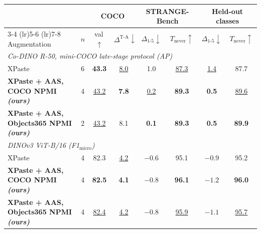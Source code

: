 \begin{tabular}{l c cc cc cc}
\toprule
& & \multicolumn{2}{c}{COCO} & \multicolumn{2}{c}{STRANGE-Bench} & \multicolumn{2}{c}{Held-out classes} \\
\cmidrule(lr){3-4} \cmidrule(lr){5-6} \cmidrule(lr){7-8}
Augmentation & $n$ & val\,$\uparrow$ & $\Delta^{\text{T-A}}\downarrow$ & $\Delta_{1\text{-}5}\downarrow$ & $T_{\text{never}}\uparrow$ & $\Delta_{1\text{-}5}\downarrow$ & $T_{\text{never}}\uparrow$ \\
\midrule
\multicolumn{8}{l}{\emph{Co-DINO R-50, mini-COCO late-stage protocol (AP)}} \\
XPaste & 6 & \textbf{43.3} & \underline{8.0} & 1.0 & \underline{87.3} & \underline{1.4} & 87.7 \\
\rowcolor{oursrow} \textbf{XPaste + AAS, COCO NPMI \emph{(ours)}} & 4 & \underline{43.2} & \textbf{7.8} & \underline{0.2} & \textbf{89.3} & \textbf{0.5} & \underline{89.6} \\
\rowcolor{oursrow} \textbf{XPaste + AAS, Objects365 NPMI \emph{(ours)}} & 2 & \underline{43.2} & 8.1 & \textbf{0.1} & \textbf{89.3} & \textbf{0.5} & \textbf{89.9} \\
\midrule
\multicolumn{8}{l}{\emph{DINOv3 ViT-B/16 (F1$_{\text{micro}}$)}} \\
XPaste & 4 & 82.3 & \underline{4.2} & \underline{$-0.6$} & 95.1 & $-0.9$ & 95.2 \\
\rowcolor{oursrow} \textbf{XPaste + AAS, COCO NPMI \emph{(ours)}} & 4 & \textbf{82.5} & \textbf{4.1} & \textbf{\boldmath $-0.8$} & \textbf{96.1} & \textbf{\boldmath $-1.2$} & \textbf{96.0} \\
\rowcolor{oursrow} \textbf{XPaste + AAS, Objects365 NPMI \emph{(ours)}} & 4 & \underline{82.4} & \underline{4.2} & \textbf{\boldmath $-0.8$} & \underline{95.9} & \underline{$-1.1$} & \underline{95.7} \\
\bottomrule
\end{tabular}
